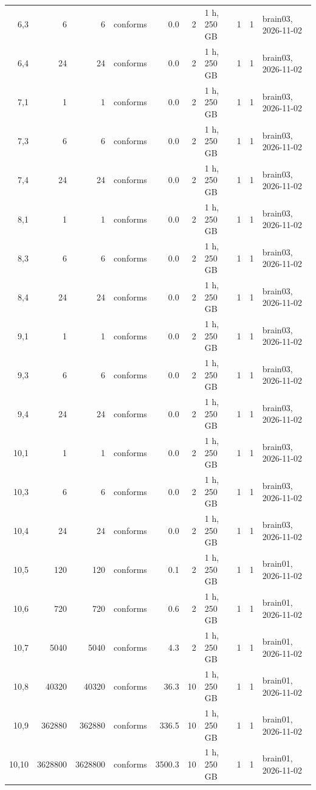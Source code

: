 \documentclass[10pt]{article}
\begin{document}
\begin{longtable}{@{}rrrlrrlrrl@{}}
\color{blue} 6,3 & 6 & 6 & conforms & 0.0 & 2 & 1 h, 250 GB & 1 & 1 & brain03, 2026-11-02 \\
\color{blue} 6,4 & 24 & 24 & conforms & 0.0 & 2 & 1 h, 250 GB & 1 & 1 & brain03, 2026-11-02 \\
\color{blue} 7,1 & 1 & 1 & conforms & 0.0 & 2 & 1 h, 250 GB & 1 & 1 & brain03, 2026-11-02 \\
\color{blue} 7,3 & 6 & 6 & conforms & 0.0 & 2 & 1 h, 250 GB & 1 & 1 & brain03, 2026-11-02 \\
\color{blue} 7,4 & 24 & 24 & conforms & 0.0 & 2 & 1 h, 250 GB & 1 & 1 & brain03, 2026-11-02 \\
\color{blue} 8,1 & 1 & 1 & conforms & 0.0 & 2 & 1 h, 250 GB & 1 & 1 & brain03, 2026-11-02 \\
\color{blue} 8,3 & 6 & 6 & conforms & 0.0 & 2 & 1 h, 250 GB & 1 & 1 & brain03, 2026-11-02 \\
\color{blue} 8,4 & 24 & 24 & conforms & 0.0 & 2 & 1 h, 250 GB & 1 & 1 & brain03, 2026-11-02 \\
\color{blue} 9,1 & 1 & 1 & conforms & 0.0 & 2 & 1 h, 250 GB & 1 & 1 & brain03, 2026-11-02 \\
\color{blue} 9,3 & 6 & 6 & conforms & 0.0 & 2 & 1 h, 250 GB & 1 & 1 & brain03, 2026-11-02 \\
\color{blue} 9,4 & 24 & 24 & conforms & 0.0 & 2 & 1 h, 250 GB & 1 & 1 & brain03, 2026-11-02 \\
\color{blue} 10,1 & 1 & 1 & conforms & 0.0 & 2 & 1 h, 250 GB & 1 & 1 & brain03, 2026-11-02 \\
\color{blue} 10,3 & 6 & 6 & conforms & 0.0 & 2 & 1 h, 250 GB & 1 & 1 & brain03, 2026-11-02 \\
\color{blue} 10,4 & 24 & 24 & conforms & 0.0 & 2 & 1 h, 250 GB & 1 & 1 & brain03, 2026-11-02 \\
\color{blue} 10,5 & 120 & 120 & conforms & 0.1 & 2 & 1 h, 250 GB & 1 & 1 & brain01, 2026-11-02 \\
\color{blue} 10,6 & 720 & 720 & conforms & 0.6 & 2 & 1 h, 250 GB & 1 & 1 & brain01, 2026-11-02 \\
\color{blue} 10,7 & 5040 & 5040 & conforms & 4.3 & 2 & 1 h, 250 GB & 1 & 1 & brain01, 2026-11-02 \\
\color{blue} 10,8 & 40320 & 40320 & conforms & 36.3 & 10 & 1 h, 250 GB & 1 & 1 & brain01, 2026-11-02 \\
\color{blue} 10,9 & 362880 & 362880 & conforms & 336.5 & 10 & 1 h, 250 GB & 1 & 1 & brain01, 2026-11-02 \\
\color{blue} 10,10 & 3628800 & 3628800 & conforms & 3500.3 & 10 & 1 h, 250 GB & 1 & 1 & brain01, 2026-11-02 \\
\bottomrule
\end{longtable}
\end{document}
